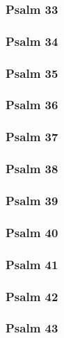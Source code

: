 \documentclass[12pt]{extarticle}
\begin{document}
\begin{multicols}{2}
\subsubsection{Psalm 33}

\newpage

\subsubsection{Psalm 34}

\newpage

\subsubsection{Psalm 35}

\newpage

\subsubsection{Psalm 36}

\newpage

\subsubsection{Psalm 37}

\newpage

\subsubsection{Psalm 38}

\newpage

\subsubsection{Psalm 39}

\newpage

\subsubsection{Psalm 40}

\newpage

\subsubsection{Psalm 41}

\newpage

\subsubsection{Psalm 42}

\newpage

\subsubsection{Psalm 43}

\newpage


\end{multicols}
\end{document}
